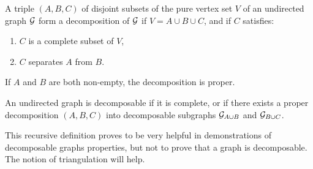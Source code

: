 \begin{definition}
 A triple $(A, B, C)$ of disjoint subsets of the pure vertex set $V$ of an undirected graph $\mathcal{G}$ form a decomposition of $\mathcal{G}$ if $V=A\cup B \cup C$, and if $C$ satisfies:
 \begin{enumerate}[label=(\roman*)]
 \item $C$ is a complete subset of  $V$,
 \item $C$ separates $A$ from $B$.
 \end{enumerate}
 If $A$ and $B$ are both non-empty, the decomposition is proper.
 \end{definition}
 
 
 \begin{definition}
 An undirected graph is decomposable if it is complete, or if there exists a proper decomposition $(A, B, C)$ into decomposable subgraphs $\mathcal{G}_{A\cup B}$ and $\mathcal{G}_{B\cup C}$.
 \end{definition}
 This recursive definition proves to be very helpful in demonstrations of decomposable graphs properties, but not to prove that a graph is decomposable. The notion of triangulation will help.
 
